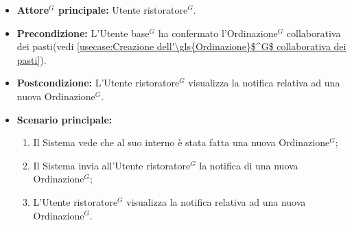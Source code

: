 \label{usecase:Visualizzazione notifica nuovo \gls{Ordine}$^G$}
\begin{itemize}
	\item \textbf{\gls{Attore}$^G$ principale:} \gls{Utente ristoratore}$^G$.

	\item \textbf{Precondizione:} L'\gls{Utente base}$^G$ ha confermato l'\gls{Ordinazione}$^G$ collaborativa dei pasti(vedi \autoref{usecase:Creazione dell'\gls{Ordinazione}$^G$ collaborativa dei pasti}).

	\item \textbf{Postcondizione:} L'\gls{Utente ristoratore}$^G$ visualizza la notifica relativa ad una nuova \gls{Ordinazione}$^G$.

	\item \textbf{Scenario principale:}
	      \begin{enumerate}
		      \item Il Sistema vede che al suo interno è stata fatta una nuova \gls{Ordinazione}$^G$;
		      \item Il Sistema invia all'\gls{Utente ristoratore}$^G$ la notifica di una nuova \gls{Ordinazione}$^G$;
		      \item L'\gls{Utente ristoratore}$^G$ visualizza la notifica relativa ad una nuova \gls{Ordinazione}$^G$.
	      \end{enumerate}
\end{itemize}
